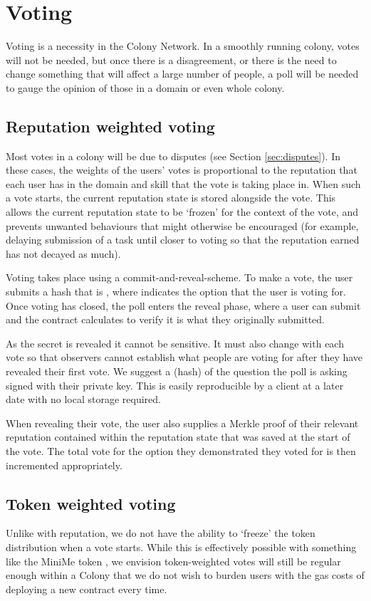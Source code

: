 \section{Voting}\label{sec:voting}
Voting is a necessity in the Colony Network. In a smoothly running colony, votes will not be needed, but once there is a disagreement, or there is the need to change something that will affect a large number of people, a poll will be needed to gauge the opinion of those in a domain or even whole colony.

\subsection{Reputation weighted voting}
Most votes in a colony will be due to disputes (see Section \ref{sec:disputes}). In these cases, the weights of the users' votes is proportional to the reputation that each user has in the domain and skill that the vote is taking place in. When such a vote starts, the current reputation state is stored alongside the vote. This allows the current reputation state to be `frozen' for the context of the vote, and prevents unwanted behaviours that might otherwise be encouraged (for example, delaying submission of a task until closer to voting so that the reputation earned has not decayed as much).

Voting takes place using a commit-and-reveal-scheme. To make a vote, the user submits a hash that is , where  indicates the option that the user is voting for. Once voting has closed, the poll enters the reveal phase, where a user can submit  and the contract calculates  to verify it is what they originally submitted.

As the secret is revealed it cannot be sensitive. It must also change with each vote so that observers cannot establish what people are voting for after they have revealed their first vote. We suggest a (hash) of the question the poll is asking signed with their private key. This is easily reproducible by a client at a later date with no local storage required.

When revealing their vote, the user also supplies a Merkle proof of their relevant reputation contained within the reputation state that was saved at the start of the vote. The total vote for the option they demonstrated they voted for is then incremented appropriately.

\subsection{Token weighted voting}
Unlike with reputation, we do not have the ability to `freeze' the token distribution when a vote starts. While this is effectively possible with something like the MiniMe token \cite{minime}, we envision token-weighted votes will still be regular enough within a Colony that we do not wish to burden users with the gas costs of deploying a new contract every time.


